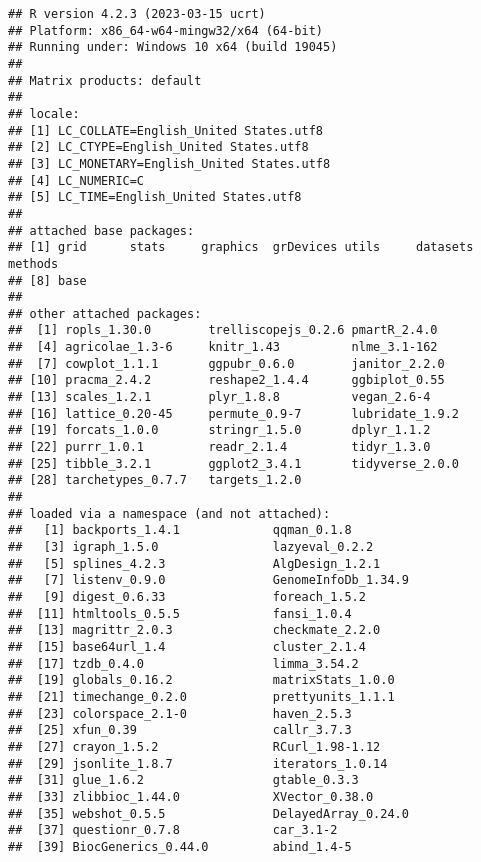 \documentclass[
]{article}
\begin{document}
\begin{verbatim}
## R version 4.2.3 (2023-03-15 ucrt)
## Platform: x86_64-w64-mingw32/x64 (64-bit)
## Running under: Windows 10 x64 (build 19045)
## 
## Matrix products: default
## 
## locale:
## [1] LC_COLLATE=English_United States.utf8 
## [2] LC_CTYPE=English_United States.utf8   
## [3] LC_MONETARY=English_United States.utf8
## [4] LC_NUMERIC=C                          
## [5] LC_TIME=English_United States.utf8    
## 
## attached base packages:
## [1] grid      stats     graphics  grDevices utils     datasets  methods  
## [8] base     
## 
## other attached packages:
##  [1] ropls_1.30.0        trelliscopejs_0.2.6 pmartR_2.4.0       
##  [4] agricolae_1.3-6     knitr_1.43          nlme_3.1-162       
##  [7] cowplot_1.1.1       ggpubr_0.6.0        janitor_2.2.0      
## [10] pracma_2.4.2        reshape2_1.4.4      ggbiplot_0.55      
## [13] scales_1.2.1        plyr_1.8.8          vegan_2.6-4        
## [16] lattice_0.20-45     permute_0.9-7       lubridate_1.9.2    
## [19] forcats_1.0.0       stringr_1.5.0       dplyr_1.1.2        
## [22] purrr_1.0.1         readr_2.1.4         tidyr_1.3.0        
## [25] tibble_3.2.1        ggplot2_3.4.1       tidyverse_2.0.0    
## [28] tarchetypes_0.7.7   targets_1.2.0      
## 
## loaded via a namespace (and not attached):
##   [1] backports_1.4.1             qqman_0.1.8                
##   [3] igraph_1.5.0                lazyeval_0.2.2             
##   [5] splines_4.2.3               AlgDesign_1.2.1            
##   [7] listenv_0.9.0               GenomeInfoDb_1.34.9        
##   [9] digest_0.6.33               foreach_1.5.2              
##  [11] htmltools_0.5.5             fansi_1.0.4                
##  [13] magrittr_2.0.3              checkmate_2.2.0            
##  [15] base64url_1.4               cluster_2.1.4              
##  [17] tzdb_0.4.0                  limma_3.54.2               
##  [19] globals_0.16.2              matrixStats_1.0.0          
##  [21] timechange_0.2.0            prettyunits_1.1.1          
##  [23] colorspace_2.1-0            haven_2.5.3                
##  [25] xfun_0.39                   callr_3.7.3                
##  [27] crayon_1.5.2                RCurl_1.98-1.12            
##  [29] jsonlite_1.8.7              iterators_1.0.14           
##  [31] glue_1.6.2                  gtable_0.3.3               
##  [33] zlibbioc_1.44.0             XVector_0.38.0             
##  [35] webshot_0.5.5               DelayedArray_0.24.0        
##  [37] questionr_0.7.8             car_3.1-2                  
##  [39] BiocGenerics_0.44.0         abind_1.4-5                

\end{verbatim}
\end{document}

